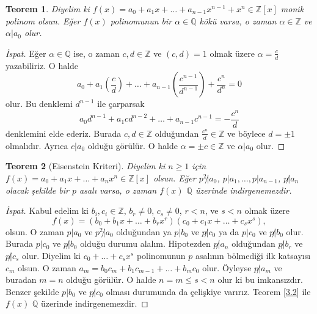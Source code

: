 \documentclass{article}
\newtheorem{thm}{Teorem}[section]
\theoremstyle{definition}
\theoremstyle{remark}
\begin{document}
			\begin{thm}
			    Diyelim ki $f(x) = a_0 + a_1x + \dots + a_{n - 1}x^{n - 1} + x^n \in \mathbb{Z}[x]$ monik polinom olsun. Eğer $f(x)$ polinomunun bir $\alpha \in \mathbb{Q}$ kökü varsa, o zaman $\alpha \in \mathbb{Z}$ ve $\alpha | a_0$ olur.
			\end{thm}
			
			\begin{proof}[İspat]
			    Eğer $\alpha \in \mathbb{Q}$ ise, o zaman $c, d \in \mathbb{Z}$ ve $(c, d) = 1$ olmak üzere $\alpha = \frac{c}{d}$ yazabiliriz. O halde
				\begin{equation*}
					a_0 + a_1(\frac{c}{d}) + \dots + a_{n - 1}(\frac{c^{n - 1}}{d^{n - 1}}) + \frac{c^n}{d^n} = 0
				\end{equation*}
				olur. Bu denklemi $d^{n - 1}$ ile çarparsak
				\begin{equation*}
					a_0d^{n - 1} + a_1cd^{n - 2} + \dots + a_{n - 1}c^{n - 1} = -\frac{c^n}{d}
				\end{equation*}
				denklemini elde ederiz. Burada $c, d \in \mathbb{Z}$ olduğundan $\frac{c^n}{d} \in \mathbb{Z}$ ve böylece $d = \pm 1$ olmalıdır. Ayrıca $c | a_0$ olduğu görülür. O halde $\alpha = \pm c \in \mathbb{Z}$ ve $\alpha | a_0$ olur.
			\end{proof}
			
			\begin{thm}[Eisenstein Kriteri]
				Diyelim ki $n \geq 1$ için $f(x) = a_0 + a_1x + \dots + a_{n}x^n \in \mathbb{Z}[x]$ olsun. Eğer $p^2 \not| a_0$, $p | a_1, \dots, p | a_{n - 1}$, $p \not| a_n$ olacak şekilde bir $p$ asalı varsa, o zaman $f(x)$ $\mathbb{Q}$ üzerinde indirgenemezdir.
			\end{thm}
			
			\begin{proof}[İspat]
				Kabul edelim ki $b_i, c_i \in \mathbb{Z}$, $b_r \neq 0$, $c_s \neq 0$, $r < n$, ve $s < n$ olmak üzere
				\begin{equation*}
					f(x) = (b_0 + b_1x + \dots + b_rx^r)(c_0 + c_1x + \dots + c_sx^s),
				\end{equation*}
				olsun. O zaman $p | a_0$ ve $p^2 \not| a_0$ olduğundan ya $p | b_0$ ve $p \not| c_0$ ya da $p | c_0$ ve $p \not| b_0$ olur. Burada $p | c_0$ ve $p \not| b_0$ olduğu durumu alalım. Hipotezden $p \not| a_n$ olduğundan $p \not| b_r$ ve $p \not| c_s$ olur. Diyelim ki $c_0 + \dots + c_sx^s$ polinomunun $p$ asalının bölmediği ilk katsayısı $c_m$ olsun. O zaman $a_m = b_0c_m + b_1c_{m - 1} + \dots + b_mc_0$ olur. Öyleyse $p \not| a_m$ ve buradan $m = n$ olduğu görülür. O halde $n = m \leq s < n$ olur ki bu imkansızdır. Benzer şekilde $p | b_0$ ve $p \not| c_0$ olması durumunda da çelişkiye varırız. Teorem \ref{3.2} ile $f(x)$ $\mathbb{Q}$ üzerinde indirgenemezdir.
			\end{proof}
			
\end{document}
